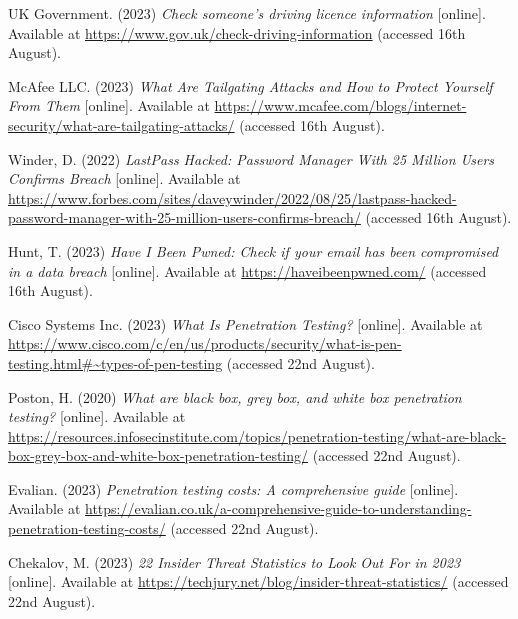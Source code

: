  \noindent [45] UK Government. (2023) \textit{Check someone's driving licence information} [online]. Available at \url{https://www.gov.uk/check-driving-information} (accessed 16th August).
 \vspace{0.2cm}

 \noindent [46] McAfee LLC. (2023) \textit{What Are Tailgating Attacks and How to Protect Yourself From Them} [online]. Available at \url{https://www.mcafee.com/blogs/internet-security/what-are-tailgating-attacks/} (accessed 16th August).
 \vspace{0.2cm}

 \noindent [47] Winder, D. (2022) \textit{LastPass Hacked: Password Manager With 25 Million Users Confirms Breach} [online]. Available at \url{https://www.forbes.com/sites/daveywinder/2022/08/25/lastpass-hacked-password-manager-with-25-million-users-confirms-breach/} (accessed 16th August).
 \vspace{0.2cm}

 \noindent [48] Hunt, T. (2023) \textit{Have I Been Pwned: Check if your email has been compromised in a data breach} [online]. Available at \url{https://haveibeenpwned.com/} (accessed 16th August).
 \vspace{0.2cm}

 \noindent [49] Cisco Systems Inc. (2023) \textit{What Is Penetration Testing?} [online]. Available at \url{https://www.cisco.com/c/en/us/products/security/what-is-pen-testing.html#~types-of-pen-testing} (accessed 22nd August).
 \vspace{0.2cm}

 \noindent [50] Poston, H. (2020) \textit{What are black box, grey box, and white box penetration testing?} [online]. Available at \url{https://resources.infosecinstitute.com/topics/penetration-testing/what-are-black-box-grey-box-and-white-box-penetration-testing/} (accessed 22nd August).
 \vspace{0.2cm}

 \noindent [51] Evalian. (2023) \textit{Penetration testing costs: A comprehensive guide} [online]. Available at \url{https://evalian.co.uk/a-comprehensive-guide-to-understanding-penetration-testing-costs/} (accessed 22nd August).
 \vspace{0.2cm}

 \noindent [52] Chekalov, M. (2023) \textit{22 Insider Threat Statistics to Look Out For in 2023} [online]. Available at \url{https://techjury.net/blog/insider-threat-statistics/} (accessed 22nd August).
 \vspace{0.2cm}

